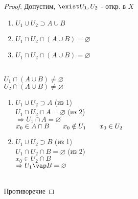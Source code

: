 \documentclass[geometry.tex]{subfiles}
\begin{document}
  \begin{proof}
    Допустим, $\exist U_1, U_2$ - откр. в $X$
    \begin{enumerate}
          \item $U_1 \cup U_2 \supset A \cup B$
          \item $U_1 \cap U_2 \cap (A \cup B) = \varnothing$
          \item $U_1 \cap   U_2 \cap (A \cup B) = \varnothing$
    \end{enumerate}\\
$U_1 \cap (A \cup B) \neq \varnothing$\\
$U_2 \cap (A \cup B) \neq \varnothing$\\

\begin{enumerate}
          \item $U_1 \cup U_2 \supset A$ (из 1)\\
$U_1 \cap U_2 \cap A = \varnothing$ (из 2)\\
$\Rightarrow U_1 \cap A = \varnothing$\\
$x_0 \in A \cap B \qquad x_0 \notin U_1 \qquad x_0 \in U_2$
          \item $U_1 \cup U_2\supset B$ (из 1)\\
$U_1 \cap U_2 \cap B = \varnothing$ (из 2)\\
$x_0 \in  U_2 \cap B$\\
$\Rightarrow  U_1 \vap B = \varnothing$
    \end{enumerate}\\
Противоречие
  \end{proof}
\end{document}
